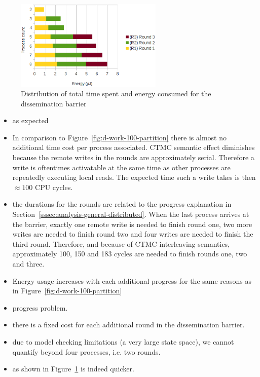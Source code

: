 \documentclass[a4paper, 10pt]{article}
\begin{document}
\begin{itemize}
\begin{figure}[htbp]
\begin{minipage}[b]{0.42\linewidth}
			\end{minipage}
			\begin{minipage}[b]{0.54\linewidth}
				\includegraphics[height=4.3cm]{charts/d-energy-work-1000-partition}
			\end{minipage}
			\caption{Distribution of total time spent and energy consumed for the dissemination barrier}
			\label{fig:d-work-1000-partition}
		\end{figure}
		\begin{itemize}
			\item as expected
			\item In comparison to Figure~\ref{fig:d-work-100-partition} there is almost no additional time cost per process associated. CTMC semantic effect diminishes because the remote writes in the rounds are approximately serial. Therefore a write is oftentimes activatable at the same time as other processes are repeatedly executing local reads. The expected time such a write takes is then $\approx 100$ CPU cycles.
			\item the durations for the rounds are related to the progress explanation in Section~\ref{sssec:analysis-general-distributed}. When the last process arrives at the barrier, exactly one remote write is needed to finish round one, two more writes are needed to finish round two and four writes are needed to finish the third round. Therefore, and because of CTMC interleaving semantics, approximately 100, 150 and 183 cycles are needed to finish rounds one, two and three.
			\item Energy usage increases with each additional progress for the same reasons as in Figure~\ref{fig:d-work-100-partition}
			\item progress problem.
			\item there is a fixed cost for each additional round in the dissemination barrier.
			\item due to model checking limitations (a very large state space), we cannot quantify beyond four processes, i.e. two rounds.
			\item as shown in Figure~\ref{fig:d-work-1000-partition} is indeed quicker.

\end{itemize}
\end{itemize}
\end{document}
